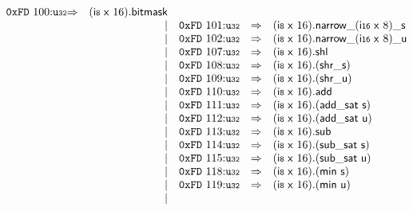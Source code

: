 $$\begin{array}{@{}l@{}rrlll@{}l@{}}
\mathtt{0xFD}~100{:}{\mathtt{u{\scriptstyle32}}} &\Rightarrow& (\mathsf{i{\scriptstyle8}}~\mathsf{x}~16).\mathsf{bitmask} \\ &&|&
\mathtt{0xFD}~101{:}{\mathtt{u{\scriptstyle32}}} &\Rightarrow& {{{{(\mathsf{i{\scriptstyle8}}~\mathsf{x}~16).\mathsf{narrow}}{\mathsf{\_}}}{(\mathsf{i{\scriptstyle16}}~\mathsf{x}~8)}}{\mathsf{\_}}}{\mathsf{s}} \\ &&|&
\mathtt{0xFD}~102{:}{\mathtt{u{\scriptstyle32}}} &\Rightarrow& {{{{(\mathsf{i{\scriptstyle8}}~\mathsf{x}~16).\mathsf{narrow}}{\mathsf{\_}}}{(\mathsf{i{\scriptstyle16}}~\mathsf{x}~8)}}{\mathsf{\_}}}{\mathsf{u}} \\ &&|&
\mathtt{0xFD}~107{:}{\mathtt{u{\scriptstyle32}}} &\Rightarrow& (\mathsf{i{\scriptstyle8}}~\mathsf{x}~16) . \mathsf{shl} \\ &&|&
\mathtt{0xFD}~108{:}{\mathtt{u{\scriptstyle32}}} &\Rightarrow& (\mathsf{i{\scriptstyle8}}~\mathsf{x}~16) . ({\mathsf{shr\_}}{\mathsf{s}}) \\ &&|&
\mathtt{0xFD}~109{:}{\mathtt{u{\scriptstyle32}}} &\Rightarrow& (\mathsf{i{\scriptstyle8}}~\mathsf{x}~16) . ({\mathsf{shr\_}}{\mathsf{u}}) \\ &&|&
\mathtt{0xFD}~110{:}{\mathtt{u{\scriptstyle32}}} &\Rightarrow& (\mathsf{i{\scriptstyle8}}~\mathsf{x}~16) . \mathsf{add} \\ &&|&
\mathtt{0xFD}~111{:}{\mathtt{u{\scriptstyle32}}} &\Rightarrow& (\mathsf{i{\scriptstyle8}}~\mathsf{x}~16) . (\mathsf{add\_sat}~\mathsf{s}) \\ &&|&
\mathtt{0xFD}~112{:}{\mathtt{u{\scriptstyle32}}} &\Rightarrow& (\mathsf{i{\scriptstyle8}}~\mathsf{x}~16) . (\mathsf{add\_sat}~\mathsf{u}) \\ &&|&
\mathtt{0xFD}~113{:}{\mathtt{u{\scriptstyle32}}} &\Rightarrow& (\mathsf{i{\scriptstyle8}}~\mathsf{x}~16) . \mathsf{sub} \\ &&|&
\mathtt{0xFD}~114{:}{\mathtt{u{\scriptstyle32}}} &\Rightarrow& (\mathsf{i{\scriptstyle8}}~\mathsf{x}~16) . (\mathsf{sub\_sat}~\mathsf{s}) \\ &&|&
\mathtt{0xFD}~115{:}{\mathtt{u{\scriptstyle32}}} &\Rightarrow& (\mathsf{i{\scriptstyle8}}~\mathsf{x}~16) . (\mathsf{sub\_sat}~\mathsf{u}) \\ &&|&
\mathtt{0xFD}~118{:}{\mathtt{u{\scriptstyle32}}} &\Rightarrow& (\mathsf{i{\scriptstyle8}}~\mathsf{x}~16) . (\mathsf{min}~\mathsf{s}) \\ &&|&
\mathtt{0xFD}~119{:}{\mathtt{u{\scriptstyle32}}} &\Rightarrow& (\mathsf{i{\scriptstyle8}}~\mathsf{x}~16) . (\mathsf{min}~\mathsf{u}) \\ &&|&

\end{array}$$
